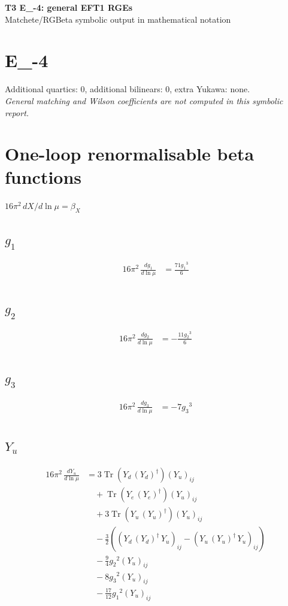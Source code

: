 \documentclass[10pt,a4paper]{article}
\begin{document}
\begin{center}
{\Large\bfseries T3 E\_-4: general EFT1 RGEs}\\[4pt]
Matchete/RGBeta symbolic output in mathematical notation
\end{center}
\bigskip
\section*{E\_-4}
Additional quartics: 0, additional bilinears: 0, extra Yukawa: none.\\
\emph{General matching and Wilson coefficients are not computed in this symbolic report.}
\clearpage
\section*{One-loop renormalisable beta functions}
$16\pi^2\,dX/d\ln\mu=\beta_X$
\subsection*{$g_1$}
\begin{align*}
16\pi^2\,\frac{d g_1}{d\ln\mu} &=\frac{71 {g_1}^3}{6} \\
\end{align*}
\subsection*{$g_2$}
\begin{align*}
16\pi^2\,\frac{d g_2}{d\ln\mu} &=-\frac{11 {g_2}^3}{6} \\
\end{align*}
\subsection*{$g_3$}
\begin{align*}
16\pi^2\,\frac{d g_3}{d\ln\mu} &=-7 {g_3}^3 \\
\end{align*}
\subsection*{$Y_u$}
\begin{align*}
16\pi^2\,\frac{d Y_u}{d\ln\mu} &=3 \operatorname{Tr}\!\left({Y_d}\,\left({Y_d}\right)^{\dagger}\right) \left({Y_u}\right)_{ij} \\
&\quad +\operatorname{Tr}\!\left({Y_e}\,\left({Y_e}\right)^{\dagger}\right) \left({Y_u}\right)_{ij} \\
&\quad +3 \operatorname{Tr}\!\left({Y_u}\,\left({Y_u}\right)^{\dagger}\right) \left({Y_u}\right)_{ij} \\
&\quad -\frac{3}{2} (\left({Y_d}\,\left({Y_d}\right)^{\dagger}\,{Y_u}\right)_{ij}-\left({Y_u}\,\left({Y_u}\right)^{\dagger}\,{Y_u}\right)_{ij}) \\
&\quad -\frac{9}{4} {g_2}^2 \left({Y_u}\right)_{ij} \\
&\quad -8 {g_3}^2 \left({Y_u}\right)_{ij} \\
&\quad -\frac{17}{12} {g_1}^2 \left({Y_u}\right)_{ij} \\
\end{align*}
\end{document}
